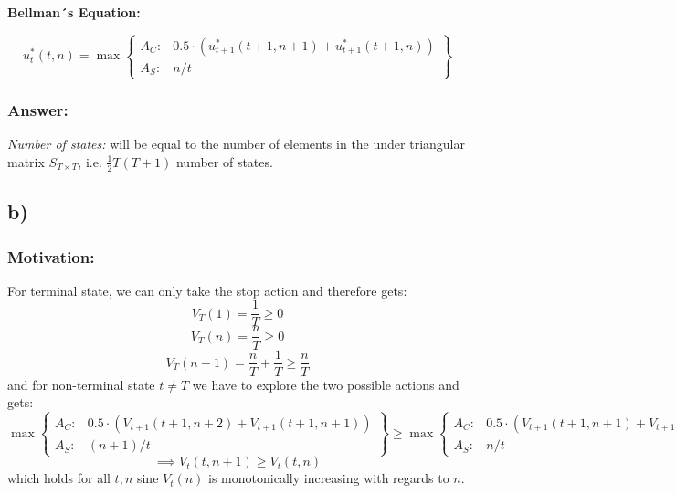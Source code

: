 \documentclass{article}
\begin{document}
\textbf{Bellman´s Equation:}

\begin{equation}
    u_{t}^{*}(t,n) = \max
    \left\{\begin{matrix}
    A_C: &  0.5 \cdot\left( u_{t+1}^{*}\left(t+1 ,n+1\right) + u_{t+1}^{*}\left(t+1 ,n\right)\right)\\
    A_S: &  n/t
    \end{matrix}\right\}
\end{equation}

\subsubsection*{Answer:}
\textit{Number of states:} will be equal to the number of elements in the under triangular matrix $S_{T\times T}$, i.e. $\frac{1}{2}T(T+1)$ number of states.

\subsection*{b)}
\subsubsection*{Motivation:}

For terminal state, we can only take the stop action and therefore gets:
\begin{equation*}
    V_T(1) = \frac{1}{T}\geq 0
\end{equation*}
\begin{equation*}
    V_T(n) = \frac{n}{T}\geq 0
\end{equation*}
\begin{equation*}
    V_T(n+1) = \frac{n}{T} + \frac{1}{T} \geq \frac{n}{T}
\end{equation*}
and for non-terminal state $t\ne T$ we have to explore the two possible actions and gets:
\begin{equation*}
    \max
    \left\{\begin{matrix}
    A_C: &  0.5 \cdot\left( V_{t+1}\left(t+1 ,n + 2\right) + V_{t+1}\left(t+1 ,n + 1\right)\right)\\
    A_S: &  (n+1)/t
    \end{matrix}\right\} \geq 
    \max
    \left\{\begin{matrix}
    A_C: &  0.5 \cdot\left( V_{t+1}\left(t+1 ,n+1\right) + V_{t+1}\left(t+1 ,n\right)\right)\\
    A_S: &  n/t
    \end{matrix}\right\}
\end{equation*}
\begin{equation*}
    \implies V_{t}(t,n+1) \geq  V_{t}(t,n) 
\end{equation*}
which holds for all $t,n$ sine $V_t(n)$ is monotonically increasing with regards to $n$.
\end{document}
